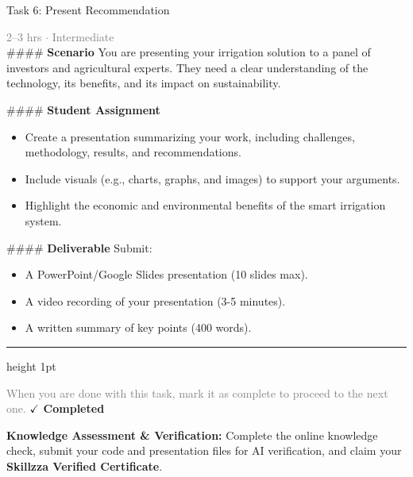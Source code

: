 \documentclass[10pt,a4paper]{article}
\begin{document}
\begin{taskbox}{Task 6: Present Recommendation}

    {\small \textcolor{gray}{2--3 hrs $\cdot$ Intermediate}}\\[12pt]

    \#\#\#\# \textbf{Scenario}  
You are presenting your irrigation solution to a panel of investors and agricultural experts. They need a clear understanding of the technology, its benefits, and its impact on sustainability.

\#\#\#\# \textbf{Student Assignment}  
\begin{itemize}
    \item Create a presentation summarizing your work, including challenges, methodology, results, and recommendations.
    \item Include visuals (e.g., charts, graphs, and images) to support your arguments.
    \item Highlight the economic and environmental benefits of the smart irrigation system.
\end{itemize}

\#\#\#\# \textbf{Deliverable}  
Submit:
\begin{itemize}
    \item A PowerPoint/Google Slides presentation (10 slides max).
    \item A video recording of your presentation (3-5 minutes).
    \item A written summary of key points (400 words).\par
\end{itemize}

    \vspace{16pt}

    \textcolor{cardBorder}{\hrule height 1pt}\vspace{8pt}

    \small \textcolor{gray}{When you are done with this task, mark it as complete to proceed to the next one.} \hfill \textbf{\textcolor{brandDark}{$\checkmark$ Completed}}

\end{taskbox}

\begin{completionbox}
    \textbf{Knowledge Assessment \& Verification:} Complete the online knowledge check, submit your code and presentation files for AI verification, and claim your \textbf{Skillzza Verified Certificate}.
\end{completionbox}
\end{document}
